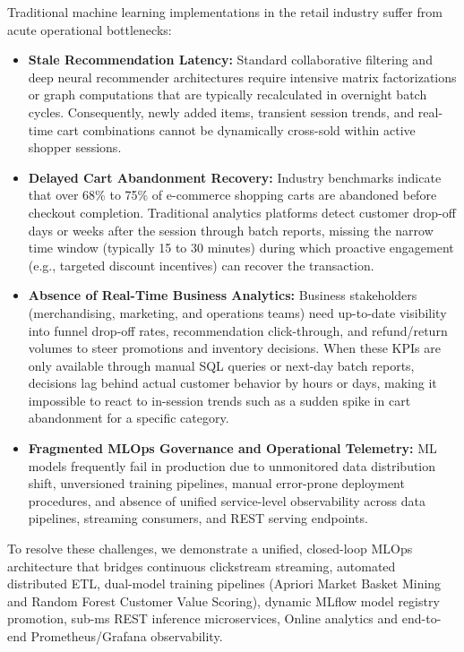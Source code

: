 \documentclass[11pt,a4paper]{article}
\begin{document}
Traditional machine learning implementations in the retail industry suffer from acute operational bottlenecks:

\begin{itemize}
    \item \textbf{Stale Recommendation Latency:} Standard collaborative filtering and deep neural recommender architectures require intensive matrix factorizations or graph computations that are typically recalculated in overnight batch cycles. Consequently, newly added items, transient session trends, and real-time cart combinations cannot be dynamically cross-sold within active shopper sessions.
    \item \textbf{Delayed Cart Abandonment Recovery:} Industry benchmarks indicate that over 68\% to 75\% of e-commerce shopping carts are abandoned before checkout completion. Traditional analytics platforms detect customer drop-off days or weeks after the session through batch reports, missing the narrow time window (typically 15 to 30 minutes) during which proactive engagement (e.g., targeted discount incentives) can recover the transaction.
    
    \item \textbf{Absence of Real-Time Business Analytics:} Business stakeholders (merchandising, marketing, and operations teams) need up-to-date visibility into funnel drop-off rates, recommendation click-through, and refund/return volumes to steer promotions and inventory decisions. When these KPIs are only available through manual SQL queries or next-day batch reports, decisions lag behind actual customer behavior by hours or days, making it impossible to react to in-session trends such as a sudden spike in cart abandonment for a specific category.
    
    \item \textbf{Fragmented MLOps Governance and Operational Telemetry:} ML models frequently fail in production due to unmonitored data distribution shift, unversioned training pipelines, manual error-prone deployment procedures, and absence of unified service-level observability across data pipelines, streaming consumers, and REST serving endpoints.
\end{itemize}

To resolve these challenges, we demonstrate a unified, closed-loop MLOps architecture that bridges continuous clickstream streaming, automated distributed ETL, dual-model training pipelines (Apriori Market Basket Mining and Random Forest Customer Value Scoring), dynamic MLflow model registry promotion, sub-ms REST inference microservices, Online analytics and end-to-end Prometheus/Grafana observability.
\end{document}
